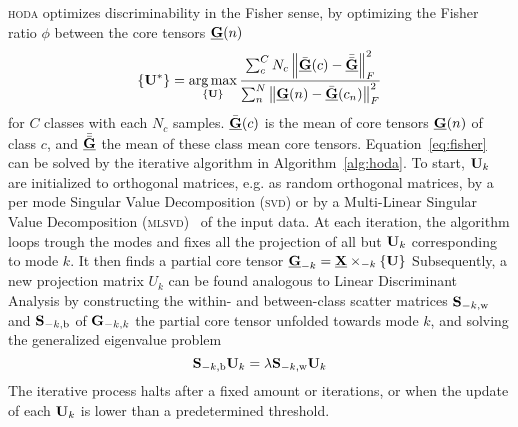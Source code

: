 \documentclass[twocolumn]{article}
\begin{document}
\textsc{hoda} optimizes discriminability in the Fisher sense, by optimizing the
Fisher ratio $\phi$ between the core tensors $\ten{G}(n)$
\begin{equation}
  \left\{\mat{U}^*\right\} = \argmax_{\{\mat{U}\}}
	\frac{\sum_c^CN_c\left\lVert\bar{\ten{G}}(c)-\bar{\bar{\ten{G}}}\right\rVert_F^2}
	{\sum_n^N\left\lVert\ten{G}(n)-\bar{\ten{G}}(c_n)\right\rVert_F^2}
	\label{eq:fisher}
\end{equation}
for $C$ classes with each $N_c$ samples. $\bar{\ten{G}}(c)$ is the mean of core
tensors $\ten{G}(n)$ of class $c$, and $\bar{\bar{\ten{G}}}$ the mean of
these class mean core tensors.
Equation~\ref{eq:fisher} can be solved by the iterative algorithm in
Algorithm~\ref{alg:hoda}.
To start, $\mat{U}_k$ are initialized to orthogonal matrices, e.g. as random
orthogonal matrices, by a per mode Singular Value Decomposition (\textsc{svd})
or by a Multi-Linear Singular Value Decomposition (\textsc{mlsvd})~\cite{Lathauwer2000} of the input data.
At each iteration, the algorithm loops trough the modes and fixes all the
projection of all but $\mat{U}_k$ corresponding to mode $k$.
It then finds a partial core tensor $\ten{G}_{-k}=\ten{X}\mmprs{\mat{U}}{k}$
Subsequently, a new projection matrix $U_k$ can be found analogous to Linear
Discriminant Analysis by constructing the within- and between-class scatter
matrices $\mat{S}_{-k,\text{w}}$ and $\mat{S}_{-k,\text{b}}$  of
$\mat{G}_{-k,k}$ the partial core tensor unfolded towards mode $k$, and solving
the generalized eigenvalue problem
\begin{equation}
  \mat{S}_{-k,\text{b}}\mat{U}_k = \mat{\lambda}\mat{S}_{-k,\text{w}}\mat{U}_k
\end{equation}
The iterative process halts after a fixed amount or iterations, or when the
update of each $\mat{U}_k$ is lower than a predetermined threshold.
\end{document}
